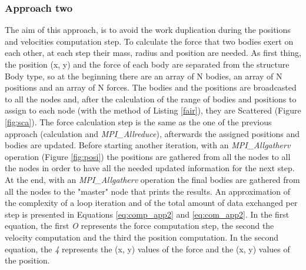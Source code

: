 \documentclass[a4paper]{article}
\begin{document}
\subsubsection{Approach two}
\label{sec:app_2}
The aim of this approach, is to avoid the work duplication during the positions and velocities computation step. To calculate the force that two bodies exert on each other, at each step their mass, radius and position are needed. As first thing, the position (x, y) and the force of each body are separated from the structure Body type, so at the beginning there are an array of N bodies, an array of N positions and an array of N forces. 
The bodies and the positions are broadcasted to all the nodes and, after the calculation of the range of bodies and positions to assign to each node (with the method of Listing \ref{fair}), they are Scattered (Figure \ref{fig:sca}).
The force calculation step is the same as the one of the previous approach (calculation and \textit{MPI\_Allreduce}), afterwards the assigned positions and bodies are updated. Before starting another iteration, with an \textit{MPI\_Allgatherv} operation (Figure \ref{fig:posi}) the positions are gathered from all the nodes to all the nodes in order to have all the needed updated information for the next step. At the end, with an \textit{MPI\_Allgatherv} operation the final bodies are gathered from all the nodes to the "master" node that prints the results.
An approximation of the complexity of a loop iteration and of the total amount of data exchanged per step is presented in Equations \ref{eq:comp_app2} and \ref{eq:com_app2}. In the first equation, the first \textit{O} represents the force computation step, the second the velocity computation and the third the position computation. In the second equation, the \textit{4} represents the (x, y) values of the force and the (x, y) values of the position.
\end{document}
